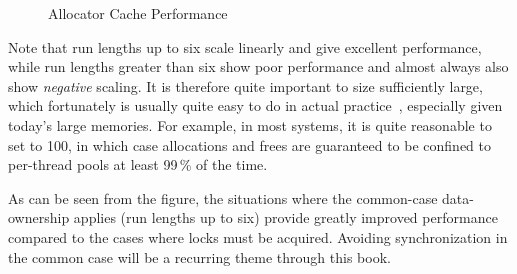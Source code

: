 \begin{figure}[tbp]
\centering
{}
\caption{Allocator Cache Performance}
\label{fig:SMPdesign:Allocator Cache Performance}
\end{figure}

Note that run lengths up to six scale linearly and give excellent performance,
while run lengths greater than six show poor performance and almost always
also show \emph{negative} scaling.
It is therefore quite important to size 
sufficiently large,
which fortunately is usually quite easy to do in actual
practice~\cite{McKenney01e}, especially given today's large memories.
For example, in most systems, it is quite reasonable to set
 to 100, in which case allocations and frees
are guaranteed to be confined to per-thread pools at least 99\,\% of
the time.

As can be seen from the figure, the situations where the common-case
data-ownership applies (run lengths up to six) provide greatly improved
performance compared to the cases where locks must be acquired.
Avoiding synchronization in the common case will be a recurring theme through
this book.

